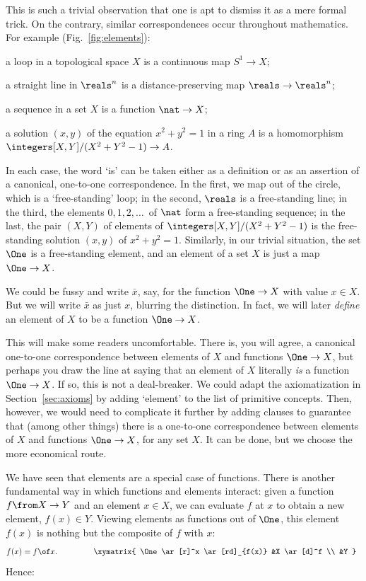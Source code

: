 \documentclass[12pt]{article}
\begin{document}
This is such a trivial observation that one is apt to dismiss it as a mere
formal trick.  On the contrary, similar correspondences occur throughout
mathematics.  For example (Fig.~\ref{fig:elements}):
% 
\begin{myitemize}
\item a loop in a topological space $X$ is a continuous map $S^1 \to X$;
\item a straight line in $\reals^n$ is a distance-preserving map $\reals
  \to \reals^n$;
\item a sequence in a set $X$ is a function $\nat \to X$;
\item a solution $(x, y)$ of the equation $x^2 + y^2 = 1$ in a ring $A$ is
  a homomorphism $\integers[X, Y]/(X^2 + Y^2 - 1) \to A$.  
\end{myitemize}
% 
In each case, the word `is' can be taken either as a definition or as an
assertion of a canonical, one-to-one correspondence.  In the first, we map
out of the circle, which is a `free-standing' loop; in the second, $\reals$
is a free-standing line; in the third, the elements $0, 1, 2, \ldots$\ of
$\nat$ form a free-standing sequence; in the last, the pair $(X, Y)$ of
elements of $\integers[X, Y]/(X^2 + Y^2 - 1)$ is the free-standing solution
$(x, y)$ of $x^2 + y^2 = 1$.  Similarly, in our trivial situation, the set
$\One$ is a free-standing element, and an element of a set $X$ is just a
map $\One \to X$.

We could be fussy and write $\bar{x}$, say, for the function $\One \to X$
with value $x \in X$.  But we will write $\bar{x}$ as just $x$, blurring
the distinction.  In fact, we will later \emph{define} an element of $X$ to
be a function $\One \to X$.

This will make some readers uncomfortable.  There is, you will agree, a
canonical one-to-one correspondence between elements of $X$ and functions
$\One \to X$, but perhaps you draw the line at saying that an element of
$X$ literally \emph{is} a function $\One \to X$.  If so, this is not a
deal-breaker.  We could adapt the axiomatization
in Section~\ref{sec:axioms} 
by adding `element' to the list of primitive
concepts.  Then, however, we would need to complicate it further by adding
clauses to guarantee that (among other things) there is a one-to-one
correspondence between elements of $X$ and functions $\One \to X$, for any
set $X$.  It can be done, but we choose the more economical route.

We have seen that elements are a special case of functions.  There is
another fundamental way in which functions and elements interact: given a
function $f\from X \to Y$ and an element $x \in X$, we can evaluate $f$ at
$x$ to obtain a new element, $f(x) \in Y$.  Viewing elements as functions
out of $\One$, this element $f(x)$ is nothing but the composite of $f$ with
$x$:
\[
f(x) = f \of x.
\qquad\qquad
\begin{array}{c}
\xymatrix{
\One \ar[r]^x \ar[rd]_{f(x)}    &X \ar[d]^f     \\
                                &Y
}
\end{array}
\]
% 
Hence:
% 
\end{document}
